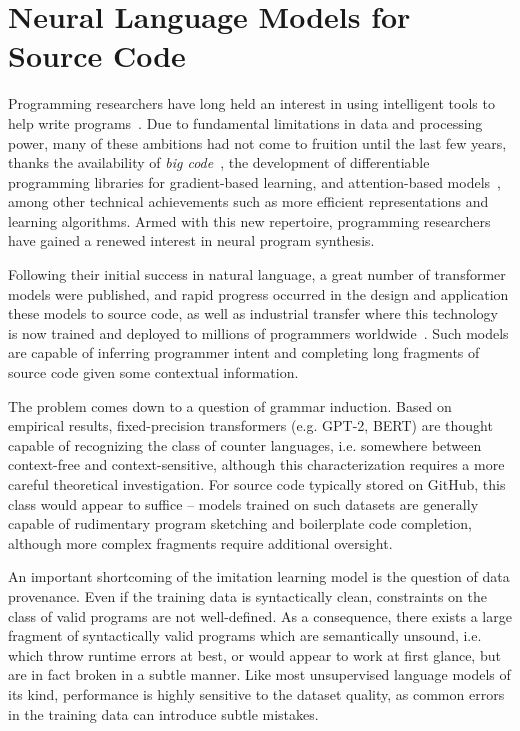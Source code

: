 \documentclass[10pt]{article}
\begin{document}
  \section{Neural Language Models for Source Code}

Programming researchers have long held an interest in using intelligent tools to help write programs~\cite{bras1993artificial}. Due to fundamental limitations in data and processing power, many of these ambitions had not come to fruition until the last few years, thanks the availability of \textit{big code}~\cite{allamanis2018survey}, the development of differentiable programming libraries for gradient-based learning, and attention-based models~\cite{vaswani2017attention}, among other technical achievements such as more efficient representations and learning algorithms. Armed with this new repertoire, programming researchers have gained a renewed interest in neural program synthesis.

 Following their initial success in natural language, a great number of transformer models were published, and rapid progress occurred in the design and application these models to source code, as well as industrial transfer where this technology is now trained and deployed to millions of programmers worldwide~\cite{chen2021evaluating}. Such models are capable of inferring programmer intent and completing long fragments of source code given some contextual information.

The problem comes down to a question of grammar induction. Based on empirical results, fixed-precision transformers (e.g. GPT-2, BERT) are thought capable of recognizing the class of counter languages, i.e. somewhere between context-free and context-sensitive, although this characterization requires a more careful theoretical investigation. For source code typically stored on GitHub, this class would appear to suffice -- models trained on such datasets are generally capable of rudimentary program sketching and boilerplate code completion, although more complex fragments require additional oversight.

An important shortcoming of the imitation learning model is the question of data provenance. Even if the training data is syntactically clean, constraints on the class of valid programs are not well-defined. As a consequence, there exists a large fragment of syntactically valid programs which are semantically unsound, i.e. which throw runtime errors at best, or would appear to work at first glance, but are in fact broken in a subtle manner. Like most unsupervised language models of its kind, performance is highly sensitive to the dataset quality, as common errors in the training data can introduce subtle mistakes.
\end{document}
